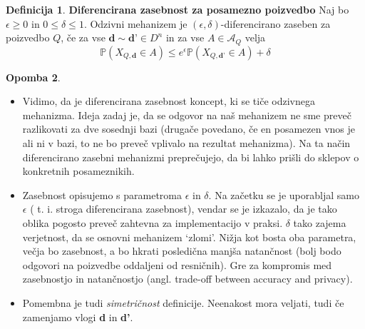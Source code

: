 \documentclass[12pt,a4paper]{amsart}
\theoremstyle{definition} %
\newtheorem{definicija}{Definicija}[section]
\newtheorem{opomba}[definicija]{Opomba}
\theoremstyle{plain} %
\begin{document}
\begin{definicija}{\textbf{Diferencirana zasebnost za posamezno poizvedbo}}
Naj bo $\epsilon \geq 0$ in $0 \leq \delta \leq 1 $. Odzivni mehanizem je $(\epsilon, \delta)$-diferencirano zaseben za poizvedbo $Q$, če za vse $\textbf{d} \sim \textbf{d'} \in D^n$  in za vse $A\in\mathcal{A}_{Q}$ velja 
\begin{equation}\label{diferen}
\mathbb{P}(X_{Q,\textbf{d}} \in A) \leq e^\epsilon \mathbb{P}(X_{Q,\textbf{d'}} \in A) + \delta \tag{4}
\end{equation}
\end{definicija}
\begin{opomba} 
\begin{itemize}
\item Vidimo, da je diferencirana zasebnost koncept, ki se tiče odzivnega mehanizma. Ideja zadaj je, da se odgovor na naš mehanizem ne sme preveč razlikovati za dve sosednji bazi (drugače povedano, če en posamezen vnos je ali ni v bazi, to ne bo preveč vplivalo na rezultat mehanizma). Na ta način diferencirano zasebni mehanizmi preprečujejo, da bi lahko prišli do sklepov o konkretnih posameznikih. 
\item Zasebnost opisujemo s parametroma $\epsilon$ in $\delta$. Na začetku se je uporabljal samo $\epsilon$ ( t. i. stroga diferencirana zasebnost), vendar se je izkazalo, da je tako oblika pogosto preveč zahtevna za implementacijo v praksi. $\delta$ tako zajema verjetnost, da se osnovni mehanizem `zlomi'. Nižja kot bosta oba parametra, večja bo zasebnost, a bo hkrati posledična manjša natančnost (bolj bodo odgovori na poizvedbe oddaljeni od resničnih).  Gre za kompromis med zasebnostjo in natančnostjo (angl. trade-off between accuracy and privacy).
\item Pomembna je tudi \textit{simetričnost} definicije. Neenakost mora veljati, tudi če zamenjamo vlogi \textbf{d} in \textbf{d'}.
\end{itemize}
\end{opomba}
\end{document}
